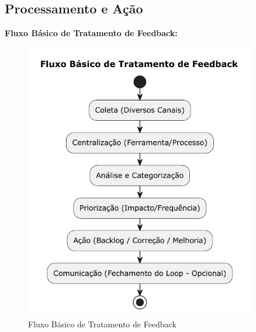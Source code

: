 \subsection{Processamento e Ação}
\label{subsec:processamento-feedback}

\textbf{Fluxo Básico de Tratamento de Feedback:}

\begin{figure}[htbp]
    \centering
    \includegraphics[width=0.9\textwidth]{../assets/diagrama-fluxo-feedback.pdf}
    \caption{Fluxo Básico de Tratamento de Feedback}
    \label{fig:fluxo-feedback}
\end{figure}

